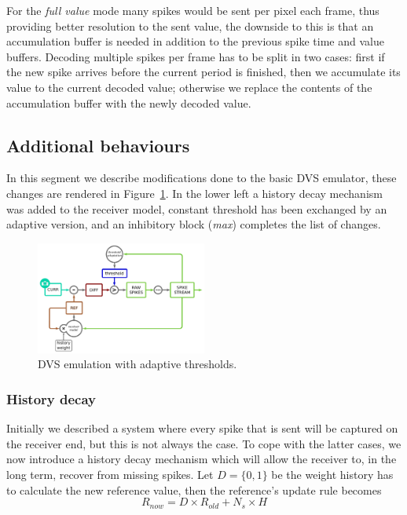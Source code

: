 \documentclass[twocolumn]{article}
\begin{document}
For the \textit{full value} mode many spikes would be sent per pixel each frame, thus providing better resolution to the sent value, the downside to this is that an accumulation buffer is needed in addition to the previous spike time and value buffers. Decoding multiple spikes per frame has to be split in two cases: first if the new spike arrives before the current period is finished, then we accumulate its value to the current decoded value; otherwise we replace the contents of the accumulation buffer with the newly decoded value.


\subsection{Additional behaviours}

In this segment we describe modifications done to the basic DVS emulator, these changes are rendered in Figure~\ref{fig:dvs_emu_inh}. In the lower left a history decay mechanism was added to the receiver model, constant threshold has been exchanged by an adaptive version, and an inhibitory block (\textit{\textsf{max}}) completes the list of changes.

\begin{figure}[htb]
  
  \includegraphics[width=0.5\textwidth]{dvs_emu_decay_adapt_inh}
  \caption{DVS emulation with adaptive thresholds.}
  \label{fig:dvs_emu_inh}
\end{figure}

\subsubsection{History decay} %

Initially we described a system where every spike that is sent will be captured on the receiver end, but this is not always the case. To cope with the latter cases, we now introduce a history decay mechanism which will allow the receiver to, in the long term, recover from missing spikes. Let $D = \{0, 1\}$ be the weight history has to calculate the new reference value, then the reference's update rule becomes
\begin{equation}
\label{eq:ref_update_decay}
R_{now} = D\times R_{old} + N_{s}\times H
\end{equation}
\end{document}
